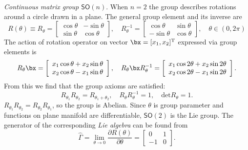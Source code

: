 \begin{example} \textit{Continuous matrix
group $\mathsf{SO}(n)$}. When $n=2$ the group describes rotations
around a circle drawn in a plane. The general group element and
its inverse are
\[R(\theta)\equiv R_{\theta}=
\left[\begin{array}{cc}
 \cos\theta &-\sin\theta\\
\sin\theta &\cos\theta
\end{array}\right],\quad
R^{-1}_{\theta}= \left[\begin{array}{cc}
 \cos\theta &\sin\theta\\
-\sin\theta &\cos\theta
\end{array}\right],\quad\theta\in (0,2\pi)\]
The action of rotation operator on vector
$\bx=[x_1,x_2]^{\textrm{T}}$ expressed via group elements is
\[R_{\theta}\bx=
\left[\begin{array}{l}
x_1\cos\theta+x_2\sin\theta\\
x_2\cos\theta-x_1\sin\theta
\end{array}\right],\quad
R_{\theta}\bx R^{-1}_{\theta}= \left[\begin{array}{l}
x_1\cos 2\theta+x_2\sin 2\theta\\
x_2\cos 2\theta-x_1\sin 2\theta
\end{array}\right].\]
From this we find that the group axioms are satisfied:
\[R_{\theta_1}R_{\theta_2}=R_{\theta_1+\theta_2},\quad
R_{\theta}R_{\theta}^{-1}=1,\quad \textrm{det}R_{\theta}=1.\]
$R_{\theta_1}R_{\theta_2}=R_{\theta_2}R_{\theta_1}$, so the group
is Abelian. Since $\theta$ is group parameter and functions on
plane manifold are differentiable, $\mathsf{SO}(2)$ is the Lie
group. The generator of the corresponding \textit{Lie algebra} can
be found from
\[\hat{\Gamma}=\lim_{\theta\rightarrow 0}\frac{\partial R(\theta)}{\partial \theta} =
\left[\begin{array}{cc}0&1\\-1&0\end{array} \right]. \]


\end{example}
